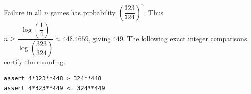 Failure in all $ n $ games has probability $\left(\dfrac{323}{324}\right)^n $. Thus $ n\ge\dfrac{\log(\dfrac{1}{4})}{\log(\dfrac{323}{324})}\approx448.4659 $, giving $\boxed{449}$. The following exact integer comparisons certify the rounding.
\begin{verbatim}
assert 4*323**448 > 324**448
assert 4*323**449 <= 324**449
\end{verbatim}
